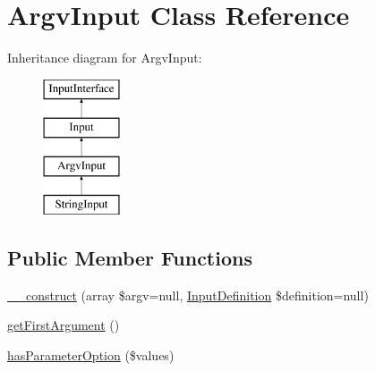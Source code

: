 \hypertarget{class_symfony_1_1_components_1_1_console_1_1_input_1_1_argv_input}{
\section{ArgvInput Class Reference}
\label{class_symfony_1_1_components_1_1_console_1_1_input_1_1_argv_input}
}
Inheritance diagram for ArgvInput:\begin{figure}[H]
\begin{center}
\leavevmode
\includegraphics[height=4.000000cm]{class_symfony_1_1_components_1_1_console_1_1_input_1_1_argv_input}
\end{center}
\end{figure}
\subsection*{Public Member Functions}
\begin{DoxyCompactItemize}
\item 
\hyperlink{class_symfony_1_1_components_1_1_console_1_1_input_1_1_argv_input_a0bf35c6e58f69ff7460b27b4b2f025bc}{\_\-\_\-construct} (array \$argv=null, \hyperlink{class_symfony_1_1_components_1_1_console_1_1_input_1_1_input_definition}{InputDefinition} \$definition=null)
\item 
\hyperlink{class_symfony_1_1_components_1_1_console_1_1_input_1_1_argv_input_af2c0efe177067f350eb7d027d5cb0d48}{getFirstArgument} ()
\item 
\hyperlink{class_symfony_1_1_components_1_1_console_1_1_input_1_1_argv_input_a0e8e5ab4feedf51eb06791d59c730463}{hasParameterOption} (\$values)
\end{DoxyCompactItemize}
